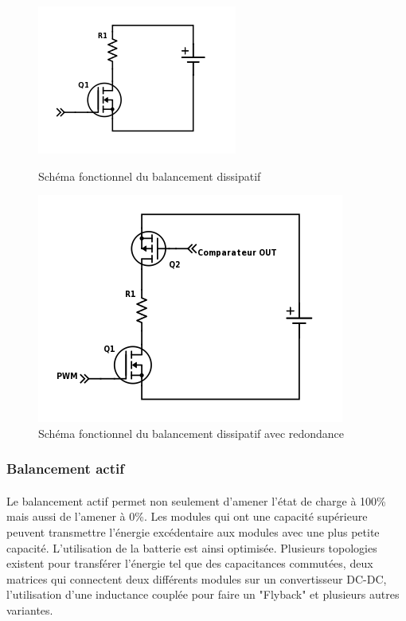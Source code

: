 \begin{figure}[H]
	\begin{minipage}{0.5\textwidth}
		\centering
		\includegraphics[scale=0.9]{Images/Dissipative_balancing.png}
		\caption{Schéma fonctionnel du balancement dissipatif}
		\label{fig:bal_dis}
	\end{minipage}
	\hfill
	\begin{minipage}{0.45\textwidth}
		\centering
		\includegraphics[scale=0.6]{Images/Dissipative_bal_comp.png}
		\caption{Schéma fonctionnel du balancement dissipatif avec redondance}
		\label{fig:bal_dis_comp}
	\end{minipage}	
\end{figure}

\subsubsection*{Balancement actif}
\paragraph*{}
Le balancement actif permet non seulement d'amener l'état de charge à 100\% mais aussi de l'amener à 0\%. Les modules qui ont une capacité supérieure peuvent transmettre l'énergie excédentaire aux modules avec une plus petite capacité. L'utilisation de la batterie est ainsi optimisée. Plusieurs topologies existent pour transférer l'énergie tel que des capacitances commutées, deux matrices qui connectent deux différents modules sur un convertisseur DC-DC, l'utilisation d'une inductance couplée pour faire un "Flyback" et plusieurs autres variantes. 

